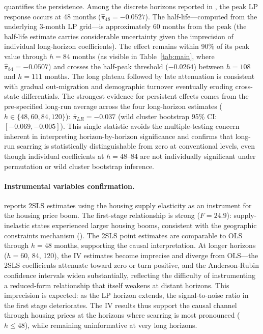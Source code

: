 \documentclass[12pt]{article}
\begin{document}
 quantifies the persistence. Among the discrete horizons reported in , the peak LP response occurs at 48 months ($\hat{\pi}_{48} = -0.0527$). The half-life---computed from the underlying 3-month LP grid---is approximately 60 months from the peak (the half-life estimate carries considerable uncertainty given the imprecision of individual long-horizon coefficients). The effect remains within 90\% of its peak value through $h = 84$ months (as visible in Table~\ref{tab:main}, where $\hat{\pi}_{84} = -0.0507$) and crosses the half-peak threshold ($-0.0264$) between $h = 108$ and $h = 111$ months. The long plateau followed by late attenuation is consistent with gradual out-migration and demographic turnover eventually eroding cross-state differentials. The strongest evidence for persistent effects comes from the pre-specified long-run average across the four long-horizon estimates ($h \in \{48, 60, 84, 120\}$): $\bar{\pi}_{LR} = -0.037$ (wild cluster bootstrap 95\% CI: $[-0.069, -0.005]$). This single statistic avoids the multiple-testing concern inherent in interpreting horizon-by-horizon significance and confirms that long-run scarring is statistically distinguishable from zero at conventional levels, even though individual coefficients at $h = 48$--84 are not individually significant under permutation or wild cluster bootstrap inference.

\paragraph{Instrumental variables confirmation.}  reports 2SLS estimates using the \citet{saiz2010geographic} housing supply elasticity as an instrument for the housing price boom. The first-stage relationship is strong ($F = 24.9$): supply-inelastic states experienced larger housing booms, consistent with the geographic constraints mechanism (). The 2SLS point estimates are comparable to OLS through $h = 48$ months, supporting the causal interpretation. At longer horizons ($h = 60$, 84, 120), the IV estimates become imprecise and diverge from OLS---the 2SLS coefficients attenuate toward zero or turn positive, and the Anderson-Rubin confidence intervals widen substantially, reflecting the difficulty of instrumenting a reduced-form relationship that itself weakens at distant horizons. This imprecision is expected: as the LP horizon extends, the signal-to-noise ratio in the first stage deteriorates. The IV results thus support the causal channel through housing prices at the horizons where scarring is most pronounced ($h \leq 48$), while remaining uninformative at very long horizons.
\end{document}
